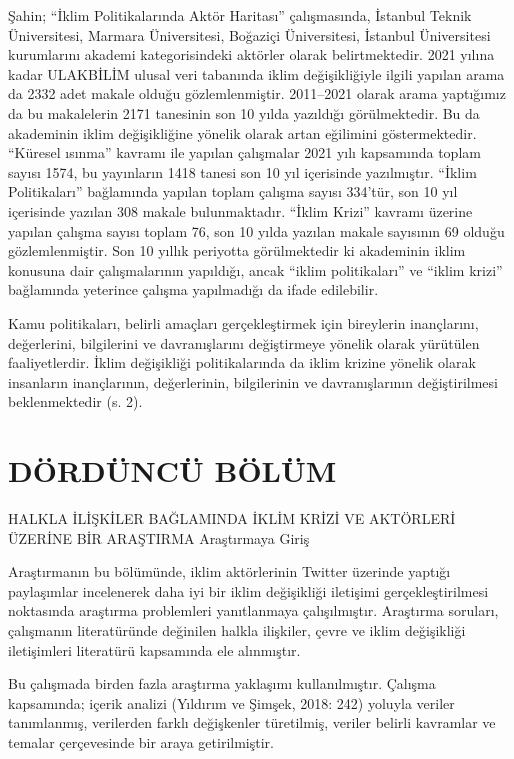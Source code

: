\documentclass[
]{book}
\begin{document}
Şahin; ``İklim Politikalarında Aktör Haritası'' çalışmasında, İstanbul Teknik Üniversitesi, Marmara Üniversitesi, Boğaziçi Üniversitesi, İstanbul Üniversitesi kurumlarını akademi kategorisindeki aktörler olarak belirtmektedir. 2021 yılına kadar ULAKBİLİM ulusal veri tabanında iklim değişikliğiyle ilgili yapılan arama da 2332 adet makale olduğu gözlemlenmiştir. 2011--2021 olarak arama yaptığımız da bu makalelerin 2171 tanesinin son 10 yılda yazıldığı görülmektedir. Bu da akademinin iklim değişikliğine yönelik olarak artan eğilimini göstermektedir. ``Küresel ısınma'' kavramı ile yapılan çalışmalar 2021 yılı kapsamında toplam sayısı 1574, bu yayınların 1418 tanesi son 10 yıl içerisinde yazılmıştır. ``İklim Politikaları'' bağlamında yapılan toplam çalışma sayısı 334'tür, son 10 yıl içerisinde yazılan 308 makale bulunmaktadır. ``İklim Krizi'' kavramı üzerine yapılan çalışma sayısı toplam 76, son 10 yılda yazılan makale sayısının 69 olduğu gözlemlenmiştir. Son 10 yıllık periyotta görülmektedir ki akademinin iklim konusuna dair çalışmalarının yapıldığı, ancak ``iklim politikaları'' ve ``iklim krizi'' bağlamında yeterince çalışma yapılmadığı da ifade edilebilir.

Kamu politikaları, belirli amaçları gerçekleştirmek için bireylerin inançlarını, değerlerini, bilgilerini ve davranışlarını değiştirmeye yönelik olarak yürütülen faaliyetlerdir. İklim değişikliği politikalarında da iklim krizine yönelik olarak insanların inançlarının, değerlerinin, bilgilerinin ve davranışlarının değiştirilmesi beklenmektedir (s. 2). \citep{demirci2016islevsel}

\hypertarget{duxf6rduxfcncuxfc-buxf6luxfcm}{%
\chapter{DÖRDÜNCÜ BÖLÜM}\label{duxf6rduxfcncuxfc-buxf6luxfcm}}

HALKLA İLİŞKİLER BAĞLAMINDA İKLİM KRİZİ VE AKTÖRLERİ ÜZERİNE BİR ARAŞTIRMA
Araştırmaya Giriş

Araştırmanın bu bölümünde, iklim aktörlerinin Twitter üzerinde yaptığı paylaşımlar incelenerek daha iyi bir iklim değişikliği iletişimi gerçekleştirilmesi noktasında araştırma problemleri yanıtlanmaya çalışılmıştır. Araştırma soruları, çalışmanın literatüründe değinilen halkla ilişkiler, çevre ve iklim değişikliği iletişimleri literatürü kapsamında ele alınmıştır.

Bu çalışmada birden fazla araştırma yaklaşımı kullanılmıştır. Çalışma kapsamında; içerik analizi (Yıldırım ve Şimşek, 2018: 242) yoluyla veriler tanımlanmış, verilerden farklı değişkenler türetilmiş, veriler belirli kavramlar ve temalar çerçevesinde bir araya getirilmiştir.
\end{document}
